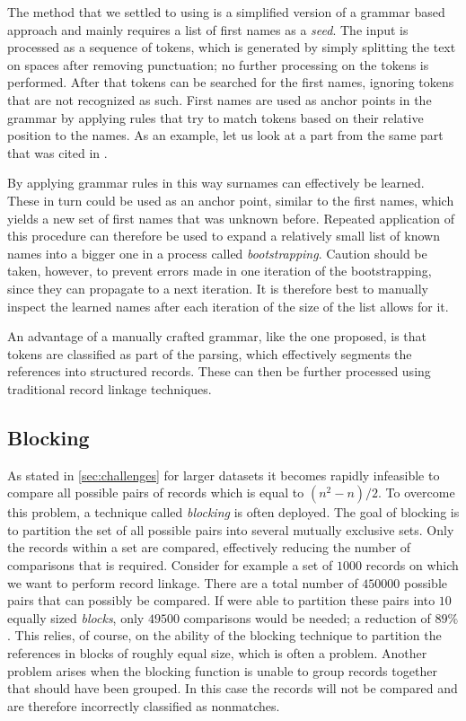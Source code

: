 \documentclass[paper=a4, fontsize=11pt]{scrartcl}
\begin{document}
The method that we settled to using is a simplified version of a grammar based approach and mainly requires a list of first names as a \emph{seed}.
The input is processed as a sequence of tokens, which is generated by simply splitting the text on spaces after removing punctuation; no further processing on the tokens is performed.
After that tokens can be searched for the first names, ignoring tokens that are not recognized as such.
First names are used as anchor points in the grammar by applying rules that try to match tokens based on their relative position to the names.
As an example, let us look at a part from the same part that was cited in .

By applying grammar rules in this way surnames can effectively be learned.
These in turn could be used as an anchor point, similar to the first names, which yields a new set of first names that was unknown before.
Repeated application of this procedure can therefore be used to expand a relatively small list of known names into a bigger one in a process called \emph{bootstrapping}.
Caution should be taken, however, to prevent errors made in one iteration of the bootstrapping, since they can propagate to a next iteration.
It is therefore best to manually inspect the learned names after each iteration of the size of the list allows for it.

An advantage of a manually crafted grammar, like the one proposed, is that tokens are classified as part of the parsing, which effectively segments the references into structured records.
These can then be further processed using traditional record linkage techniques.

\subsection{Blocking}
\label{sec:blocking}
As stated in \cref{sec:challenges} for larger datasets it becomes rapidly infeasible to compare all possible pairs of records which is equal to $(n^2-n)/2$.
To overcome this problem, a technique called \emph{blocking} is often deployed.
The goal of blocking is to partition the set of all possible pairs into several mutually exclusive sets.
Only the records within a set are compared, effectively reducing the number of comparisons that is required.
Consider for example a set of $1000$ records on which we want to perform record linkage.
There are a total number of $450000$ possible pairs that can possibly be compared.
If were able to partition these pairs into $10$ equally sized \emph{blocks}, only $49500$ comparisons would be needed; a reduction of $89\%$.
This relies, of course, on the ability of the blocking technique to partition the references in blocks of roughly equal size, which is often a problem.
Another problem arises when the blocking function is unable to group records together that should have been grouped.
In this case the records will not be compared and are therefore incorrectly classified as nonmatches.
\end{document}
